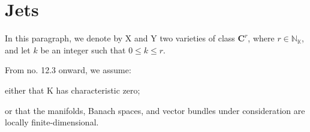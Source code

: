 \section{Jets}

In this paragraph, we denote by X and Y two varieties of class \(\mathbf{C}^r\), where \(r \in \mathbb{N}_{\mathbb{K}}\), and let \(k\) be an integer such that \(0 \leqslant k \leqslant r\).

From no. 12.3 onward, we assume:

either that K has characteristic zero;

or that the manifolds, Banach spaces, and vector bundles under consideration are locally finite-dimensional.

